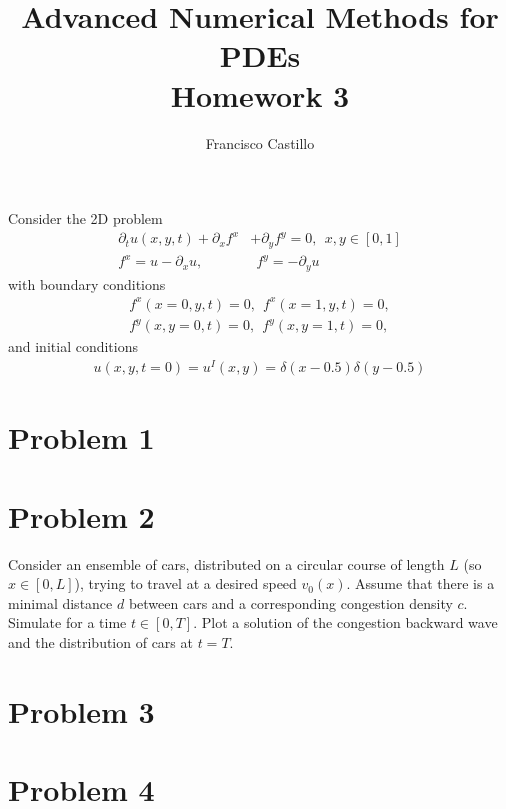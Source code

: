 \documentclass[12pt,answers]{exam}
\begin{document}


\title{\textbf{Advanced Numerical Methods for PDEs}\\ \Large{Homework 3}}%
\author{Francisco Castillo}


\maketitle
Consider the 2D problem
\begin{align*}
\partial_tu(x,y,t) + \partial_xf^x &+ \partial_yf^y = 0,~~ x,y\in[0,1]\\
f^x = u - \partial_xu,&~~ f^y = - \partial_yu
\end{align*}
with boundary conditions
\begin{align*}
f^x(x=0,y,t) = 0,~~f^x(x=1,y,t) = 0,\\
f^y(x,y=0,t) = 0,~~f^y(x,y=1,t) = 0,
\end{align*}
and initial conditions
\begin{align*}
u(x,y,t=0) = u^I(x,y) = \delta(x-0.5)\delta(y-0.5)
\end{align*}
\section*{Problem 1}

\newpage
\section*{Problem 2}

\newpage

Consider an ensemble of cars, distributed on a circular course of length $L$ (so $x\in[0, L]$), trying to travel at a desired speed $v_0(x)$. Assume that there is a minimal distance $d$ between cars and a corresponding congestion density $c$. Simulate for a time $t\in[0,T]$.
Plot a solution of the congestion backward wave and the
distribution of cars at $t = T$.

\section*{Problem 3}
%
\newpage
\section*{Problem 4}
%
\end{document}
